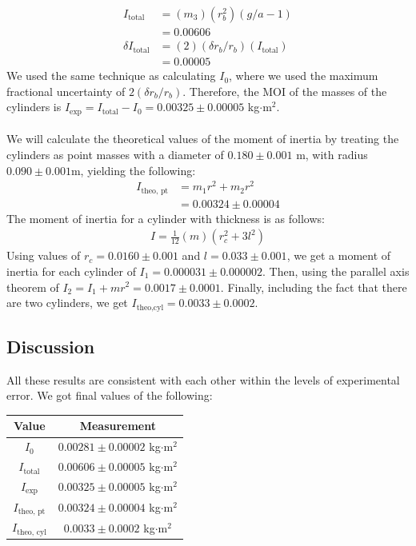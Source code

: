 \documentclass[9pt]{extarticle}
\newcommand{\plain}[1]{\textrm{#1}}
\begin{document}
{\begin{align*}
	I_{\plain{total}} &= (m_3)(r_b^2)(g/a - 1)\\
	&= 0.00606\\
	\delta I_{\plain{total}} &= (2)(\delta r_b/r_b)(I_{\plain{total}})\\
	&= 0.00005
\end{align*}
We used the same technique as calculating $I_{0}$, where we used the maximum fractional uncertainty of $2(\delta r_b/r_b)$. Therefore, the MOI of the masses of the cylinders is $I_{\plain{exp}} = I_{\plain{total}} - I_{0} = 0.00325\pm 0.00005$ kg$\cdot$m$^2$.\\
\\
We will calculate the theoretical values of the moment of inertia by treating the cylinders as point masses with a diameter of $0.180\pm 0.001$ m, with radius $0.090\pm 0.001$m, yielding the following:
\begin{align*}
	I_{\plain{theo, pt}} &= m_{1}r^2 + m_{2}r^2\\
	&= 0.00324\pm 0.00004
\end{align*}
The moment of inertia for a cylinder with thickness is as follows:
\begin{align*}
	I = \frac{1}{12}(m)(r_c^2 + 3l^2)
\end{align*}
Using values of $r_c = 0.0160\pm 0.001$ and $l = 0.033\pm 0.001$, we get a moment of inertia for each cylinder of $I_{1} = 0.000031\pm 0.000002$. Then, using the parallel axis theorem of $I_{2} = I_{1} + mr^2 = 0.0017\pm 0.0001$. Finally, including the fact that there are two cylinders, we get $I_{\plain{theo,cyl}} = 0.0033\pm 0.0002$.
\subsection*{Discussion}
All these results are consistent with each other within the levels of experimental error. We got final values of the following:
\begin{center}
	\renewcommand{\arraystretch}{1.5}
	\begin{tabular}{c|c}
	Value & Measurement \\
	\hline
	$I_{0}$ & $0.00281\pm 0.00002$ kg$\cdot$m$^2$ \\
	$I_{\plain{total}}$ & $0.00606\pm 0.00005$ kg$\cdot$m$^2$\\
	$I_{\plain{exp}}$ & $0.00325\pm 0.00005$ kg$\cdot$m$^2$ \\
	$I_{\plain{theo, pt}}$ & $0.00324\pm 0.00004$ kg$\cdot$m$^2$ \\
	$I_{\plain{theo, cyl}}$ & $0.0033\pm 0.0002$ kg$\cdot$m$^2$
	\end{tabular}
\end{center}
}
\end{document}
